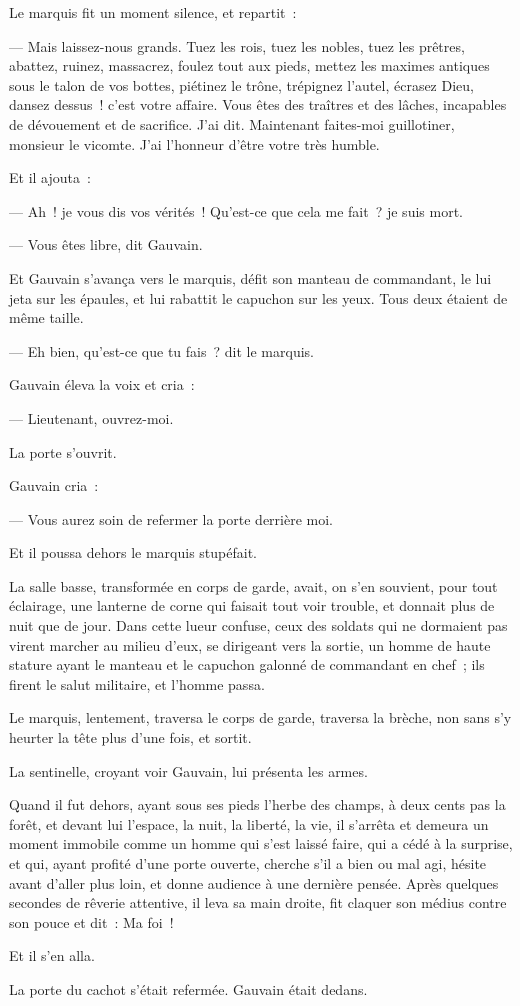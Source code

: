 \documentclass[french,twoside]{book} %
\begin{document}
Le marquis fit un moment silence, et repartit :\par
— Mais laissez-nous grands. Tuez les rois, tuez les nobles, tuez les prêtres, abattez, ruinez, massacrez, foulez tout aux pieds, mettez les maximes antiques sous le talon de vos bottes, piétinez le trône, trépignez l’autel, écrasez Dieu, dansez dessus ! c’est votre affaire. Vous êtes des traîtres et des lâches, incapables de dévouement et de sacrifice. J’ai dit. Maintenant faites-moi guillotiner, monsieur le vicomte. J’ai l’honneur d’être votre très humble.\par
Et il ajouta :\par
— Ah ! je vous dis vos vérités ! Qu’est-ce que cela me fait ? je suis mort.\par
— Vous êtes libre, dit Gauvain.\par
Et Gauvain s’avança vers le marquis, défit son manteau de commandant, le lui jeta sur les épaules,  et lui rabattit le capuchon sur les yeux. Tous deux étaient de même taille.\par
— Eh bien, qu’est-ce que tu fais ? dit le marquis.\par
Gauvain éleva la voix et cria :\par
— Lieutenant, ouvrez-moi.\par
La porte s’ouvrit.\par
Gauvain cria :\par
— Vous aurez soin de refermer la porte derrière moi.\par
Et il poussa dehors le marquis stupéfait.\par
La salle basse, transformée en corps de garde, avait, on s’en souvient, pour tout éclairage, une lanterne de corne qui faisait tout voir trouble, et donnait plus de nuit que de jour. Dans cette lueur confuse, ceux des soldats qui ne dormaient pas virent marcher au milieu d’eux, se dirigeant vers la sortie, un homme de haute stature ayant le manteau et le capuchon galonné de commandant en chef ; ils firent le salut militaire, et l’homme passa.\par
Le marquis, lentement, traversa le corps de garde, traversa la brèche, non sans s’y heurter la tête plus d’une fois, et sortit.\par
La sentinelle, croyant voir Gauvain, lui présenta les armes.\par
Quand il fut dehors, ayant sous ses pieds l’herbe des champs, à deux cents pas la forêt, et devant lui l’espace, la nuit, la liberté, la vie, il s’arrêta et demeura un moment immobile comme un homme qui s’est laissé faire, qui a cédé à la surprise, et qui, ayant profité d’une porte ouverte, cherche s’il a bien ou mal  agi, hésite avant d’aller plus loin, et donne audience à une dernière pensée. Après quelques secondes de rêverie attentive, il leva sa main droite, fit claquer son médius contre son pouce et dit : Ma foi !\par
Et il s’en alla.\par
La porte du cachot s’était refermée. Gauvain était dedans.
\end{document}
